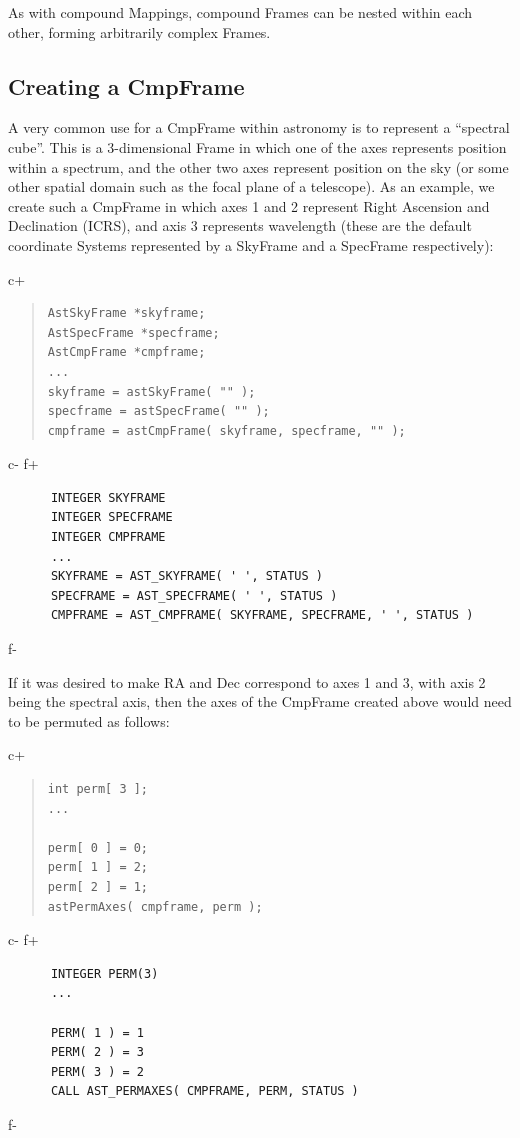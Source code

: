 \documentclass[twoside,11pt]{article}
\begin{document}
As with compound Mappings, compound Frames can be nested within each
other, forming arbitrarily complex Frames.

\subsection{Creating a CmpFrame}
A very common use for a CmpFrame within astronomy is to represent a
``spectral cube''. This is a 3-dimensional Frame in which one of the axes
represents position within a spectrum, and the other two axes represent
position on the sky (or some other spatial domain such as the focal plane
of a telescope). As an example, we create such a CmpFrame in which axes
1 and 2 represent Right Ascension and Declination (ICRS), and axis 3
represents wavelength (these are the default coordinate Systems
represented by a SkyFrame and a SpecFrame respectively):

c+
\begin{quote}
\small
\begin{verbatim}
AstSkyFrame *skyframe;
AstSpecFrame *specframe;
AstCmpFrame *cmpframe;
...
skyframe = astSkyFrame( "" );
specframe = astSpecFrame( "" );
cmpframe = astCmpFrame( skyframe, specframe, "" );
\end{verbatim}
\normalsize
\end{quote}
c-
f+
\small
\begin{verbatim}
      INTEGER SKYFRAME
      INTEGER SPECFRAME
      INTEGER CMPFRAME
      ...
      SKYFRAME = AST_SKYFRAME( ' ', STATUS )
      SPECFRAME = AST_SPECFRAME( ' ', STATUS )
      CMPFRAME = AST_CMPFRAME( SKYFRAME, SPECFRAME, ' ', STATUS )
\end{verbatim}
\normalsize
f-

If it was desired to make RA and Dec correspond to axes 1 and 3, with
axis 2 being the spectral axis, then the axes of the CmpFrame created
above would need to be permuted as follows:

c+
\begin{quote}
\small
\begin{verbatim}
int perm[ 3 ];
...

perm[ 0 ] = 0;
perm[ 1 ] = 2;
perm[ 2 ] = 1;
astPermAxes( cmpframe, perm );
\end{verbatim}
\normalsize
\end{quote}
c-
f+
\small
\begin{verbatim}
      INTEGER PERM(3)
      ...

      PERM( 1 ) = 1
      PERM( 2 ) = 3
      PERM( 3 ) = 2
      CALL AST_PERMAXES( CMPFRAME, PERM, STATUS )
\end{verbatim}
\normalsize
f-
\end{document}
